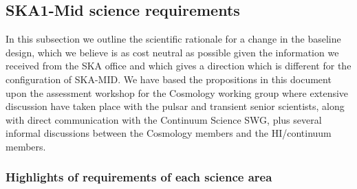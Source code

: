 \documentclass[sfheadings,a4paper,times,9pt,floats,floatfix]{article}
\begin{document}
\subsection{SKA1-Mid science requirements}\label{sec:sci-req}

In this subsection we outline the scientific rationale for a change in
the baseline design, which we believe is as cost neutral as possible given the information we received from the
SKA office and which gives a direction which is different for the configuration of SKA-MID.
We have based the propositions in this document upon the assessment workshop for the
Cosmology working group where extensive discussion have taken place with the pulsar and
transient senior scientists, along with direct communication with the
Continuum Science SWG, plus several informal discussions between the Cosmology
members and the HI/continuum members.

\subsubsection{Highlights of requirements of each science area}
\end{document}
